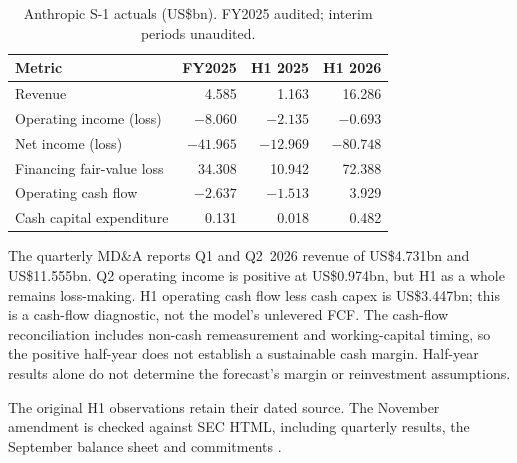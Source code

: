 \documentclass[11pt]{article}
\begin{document}
\begin{table}[H]
\centering
\small
\caption{Anthropic S-1 actuals (US\$bn). FY2025 audited; interim periods unaudited.}
\label{tab:anthropicactuals}
\begin{tabular}{lrrr}
\toprule
Metric & FY2025 & H1 2025 & H1 2026 \\
\midrule
Revenue & 4.585 & 1.163 & 16.286 \\
Operating income (loss) & $-8.060$ & $-2.135$ & $-0.693$ \\
Net income (loss) & $-41.965$ & $-12.969$ & $-80.748$ \\
Financing fair-value loss & 34.308 & 10.942 & 72.388 \\
Operating cash flow & $-2.637$ & $-1.513$ & 3.929 \\
Cash capital expenditure & 0.131 & 0.018 & 0.482 \\
\bottomrule
\end{tabular}
\end{table}

The quarterly MD\&A reports Q1 and Q2~2026 revenue of US\$4.731bn and US\$11.555bn. Q2 operating income is positive at US\$0.974bn, but H1 as a whole remains loss-making. H1 operating cash flow less cash capex is US\$3.447bn; this is a cash-flow diagnostic, not the model's unlevered FCF. The cash-flow reconciliation includes non-cash remeasurement and working-capital timing, so the positive half-year does not establish a sustainable cash margin. Half-year results alone do not determine the forecast's margin or reinvestment assumptions.

The original H1 observations retain their dated source. The November amendment is checked against SEC HTML, including quarterly results, the September balance sheet and commitments \citep{anthropics1amend2026}.
\end{document}

